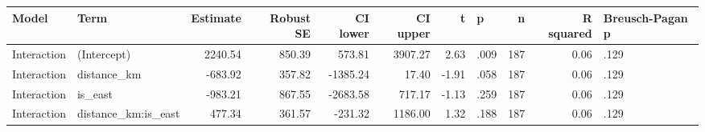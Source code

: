 \begingroup\footnotesize
\begin{tabular}{llrrrrrlrrl}
  \toprule
Model & Term & Estimate & Robust SE & CI lower & CI upper & t & p & n & R squared & Breusch-Pagan p \\ 
  \midrule
Interaction & (Intercept) & 2240.54 & 850.39 & 573.81 & 3907.27 & 2.63 & .009 & 187 & 0.06 & .129 \\ 
  Interaction & distance\_km & -683.92 & 357.82 & -1385.24 & 17.40 & -1.91 & .058 & 187 & 0.06 & .129 \\ 
  Interaction & is\_east & -983.21 & 867.55 & -2683.58 & 717.17 & -1.13 & .259 & 187 & 0.06 & .129 \\ 
  Interaction & distance\_km:is\_east & 477.34 & 361.57 & -231.32 & 1186.00 & 1.32 & .188 & 187 & 0.06 & .129 \\ 
   \bottomrule
\end{tabular}
\endgroup
